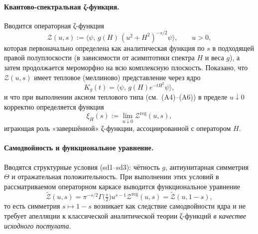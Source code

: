 \documentclass{article}
\numberwithin{equation}{section}
\theoremstyle{plain}
\theoremstyle{definition}
\theoremstyle{remark}
\begin{document}
\paragraph{Квантово-спектральная ζ-функция.}
Вводится операторная ζ-функция
\begin{equation}
\mathcal Z(u,s):=\langle\psi,\,g(H)\,(u^2+H^2)^{-s/2}\psi\rangle,
\qquad u>0,
\end{equation}
которая первоначально определена как аналитическая функция по $s$
в подходящей правой полуплоскости
(в зависимости от асимптотики спектра $H$ и веса $g$),
а затем продолжается мероморфно на всю комплексную плоскость.
Показано, что $\mathcal Z(u,s)$ имеет тепловое (меллиново) представление
через ядро~\cite{BerlineGetzlerVergne1992}
\begin{equation}
K_g(t)=\langle\psi,\,g(H)e^{-tH^2}\psi\rangle,
\label{eq:QSSC0005}
\end{equation}
и что при выполнении аксиом теплового типа (см.\ (A4)–(A6))
в пределе $u\downarrow 0$ корректно определяется функция
\begin{equation}
\xi_H(s):=\lim_{u\downarrow0}\mathcal Z^{\mathrm{reg}}(u,s),
\label{eq:QSSC0006}
\end{equation}
играющая роль «завершённой» ζ-функции, ассоциированной с оператором $H$.

\paragraph{Самодвойность и функциональное уравнение.}
Вводятся структурные условия (sd1–sd3): чётность $g$, антиунитарная симметрия $\Theta$
и отражательная положительность.
При выполнении этих условий в рассматриваемом операторном каркасе выводится
функциональное уравнение
\begin{equation}
\widetilde{\mathcal Z}(u,s)
=\pi^{-s/2}\Gamma\!\big(\tfrac s2\big)u^{s-1}\mathcal Z^{\mathrm{reg}}(u,s)
=\widetilde{\mathcal Z}(u,1-s),
\end{equation}
то есть симметрия $s\mapsto 1-s$ возникает как следствие самодвойности ядра
и не требует апелляции к классической аналитической теории ζ-функций
\emph{в качестве исходного постулата}.
\end{document}
